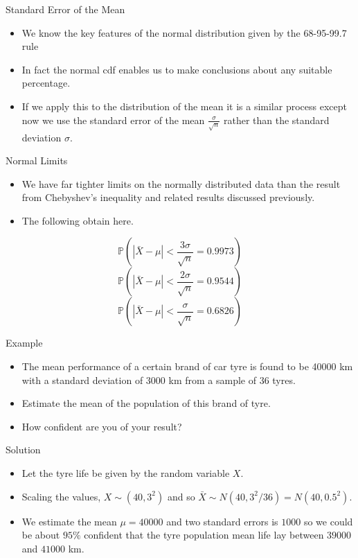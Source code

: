 \documentclass[ignorenonframetext,]{beamer}
\begin{document}
\begin{frame}{Standard Error of the Mean}

\begin{itemize}
\item
  We know the key features of the normal distribution given by the
  68-95-99.7 rule
\item
  In fact the normal cdf enables us to make conclusions about any
  suitable percentage.
\item
  If we apply this to the distribution of the mean it is a similar
  process except now we use the {standard error of the mean}
  \(\frac{\sigma}{\sqrt{n}}\) rather than the standard deviation
  \(\sigma\).
\end{itemize}

\end{frame}

\begin{frame}{Normal Limits}

\begin{itemize}
\item
  We have far tighter limits on the normally distributed data than the
  result from Chebyshev's inequality and related results discussed
  previously.
\item
  The following obtain here.
\end{itemize}

\[\mathbb{P}\left(|\bar{X}-\mu|<\frac{3\sigma}{\sqrt{n}}=0.9973\right)\]
\[\mathbb{P}\left(|\bar{X}-\mu|<\frac{2\sigma}{\sqrt{n}}=0.9544\right)\]
\[\mathbb{P}\left(|\bar{X}-\mu|<\frac{\sigma}{\sqrt{n}}=0.6826\right)\]

\end{frame}

\begin{frame}{Example}

\begin{itemize}
\item
  The mean performance of a certain brand of car tyre is found to be
  40000 km with a standard deviation of 3000 km from a sample of 36
  tyres.
\item
  Estimate the mean of the population of this brand of tyre.
\item
  How confident are you of your result?
\end{itemize}

\end{frame}

\begin{frame}{Solution}

\begin{itemize}
\item
  Let the tyre life be given by the random variable \(X\).
\item
  Scaling the values, \(X\sim (40, 3^2)\) and so
  \(\bar{X}\sim N(40, 3^2/36) = N(40, 0.5^2)\).
\item
  We estimate the mean \(\mu=40000\) and two standard errors is \(1000\)
  so we could be about \(95\%\) confident that the tyre population mean
  life lay between \(39000\) and \(41000\) km.
\end{itemize}

\end{frame}
\end{document}
